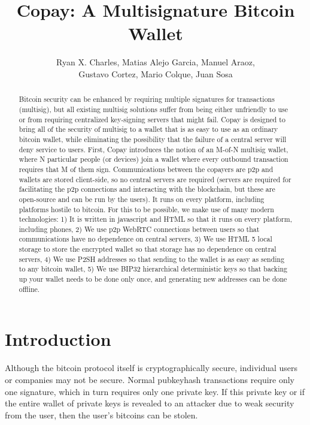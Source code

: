 \documentclass{article}
\begin{document}
\pagestyle{headings}
\title{Copay: A Multisignature Bitcoin Wallet}
\author{
Ryan X. Charles,
Matias Alejo Garcia,
Manuel Araoz,\\
Gustavo Cortez,
Mario Colque,
Juan Sosa
}
\date{}
\maketitle
\begin{abstract}
Bitcoin security can be enhanced by requiring multiple signatures for transactions (multisig), but all existing multisig solutions suffer from being either unfriendly to use or from requiring centralized key-signing servers that might fail.
Copay is designed to bring all of the security of multisig to a wallet that is as easy to use as an ordinary bitcoin wallet, while eliminating the possibility that the failure of a central server will deny service to users.
First, Copay introduces the notion of an M-of-N multisig wallet, where N particular people (or devices) join a wallet where every outbound transaction requires that M of them sign.
Communications between the copayers are p2p and wallets are stored client-side, so no central servers are required (servers are required for facilitating the p2p connections and interacting with the blockchain, but these are open-source and can be run by the users).
It runs on every platform, including platforms hostile to bitcoin.
For this to be possible, we make use of many modern technologies:
1) It is written in javascript and HTML so that it runs on every platform, including phones,
2) We use p2p WebRTC connections between users so that communications have no dependence on central servers,
3) We use HTML 5 local storage to store the encrypted wallet so that storage has no dependence on central servers,
4) We use P2SH addresses so that sending to the wallet is as easy as sending to any bitcoin wallet,
5) We use BIP32 hierarchical deterministic keys so that backing up your wallet needs to be done only once, and generating new addresses can be done offline.
\end{abstract}

\section{Introduction}

Although the bitcoin protocol itself is cryptographically secure, individual users or companies may not be secure.
Normal pubkeyhash transactions require only one signature, which in turn requires only one private key.
If this private key or if the entire wallet of private keys is revealed to an attacker due to weak security from the user, then the user's bitcoins can be stolen.
\end{document}
